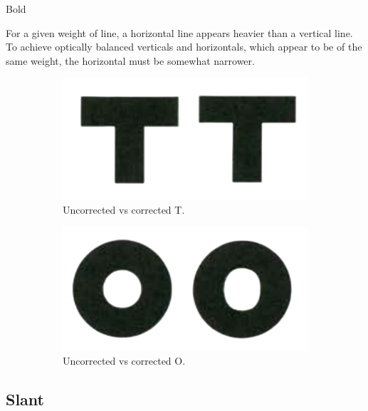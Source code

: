   Bold 

  \begin{theorem}[Weight]
    For a given weight of line, a horizontal line appears heavier than a vertical line. To achieve optically balanced verticals and horizontals, which appear to be of the same weight, the horizontal must be somewhat narrower.  

    \begin{figure}[H]
      \centering
      \begin{subfigure}[b]{0.48\textwidth}
        \centering
        \includegraphics[width=\textwidth]{img/t.png}
        \caption{Uncorrected vs corrected T.}
        \label{fig:t}
      \end{subfigure}
      \hfill 
      \begin{subfigure}[b]{0.48\textwidth}
        \centering
        \includegraphics[width=\textwidth]{img/o.png}
        \caption{Uncorrected vs corrected O.}
        \label{fig:o}
      \end{subfigure}
      \caption{}
      \label{fig:weight}
    \end{figure}
  \end{theorem} 

\subsection{Slant}

